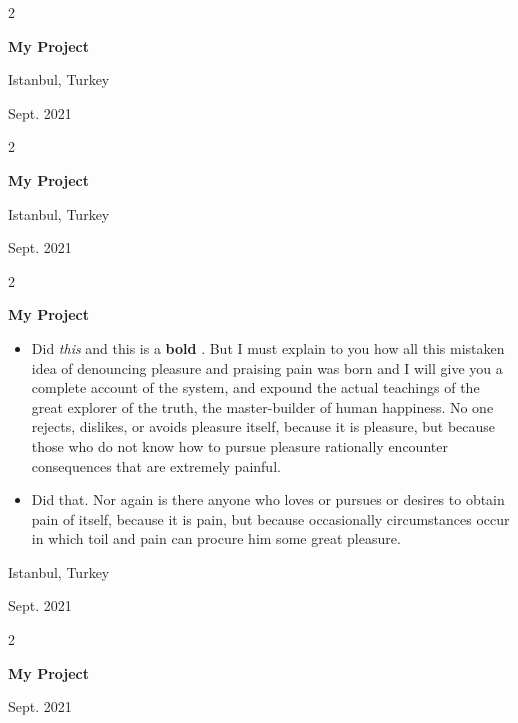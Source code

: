 \documentclass[10pt, letterpaper]{article}
\newenvironment{highlights}{
    \begin{itemize}[
        topsep=0.10 cm,
        parsep=0.10 cm,
        partopsep=0pt,
        itemsep=0pt,
        leftmargin=0.4 cm + 10pt
    ]
}{
    \end{itemize}
} %
\newenvironment{twocolentry}[2][]{
    \onecolentry
    \def\secondColumn{#2}
    \setcolumnwidth{\fill, 4.5 cm}
    \begin{paracol}{2}
}{
    \switchcolumn \raggedleft \secondColumn
    \end{paracol}
    \endonecolentry
} %
\let\hrefWithoutArrow\href
\renewcommand{\href}[2]{\hrefWithoutArrow{#1}{\mbox{\ifthenelse{\equal{#2}{}}{ }{#2 }\raisebox{.15ex}{\footnotesize \faExternalLink*}}}}
\begin{document}
        \vspace{0.2 cm}

        \begin{twocolentry}{
            Istanbul, Turkey

        Sept. 2021
        }
            \textbf{My Project}
        \end{twocolentry}


        \vspace{0.2 cm}

        \begin{twocolentry}{
            Istanbul, Turkey

        Sept. 2021
        }
            \textbf{My Project}
        \end{twocolentry}


        \vspace{0.2 cm}

        \begin{twocolentry}{
            Istanbul, Turkey

        Sept. 2021
        }
            \textbf{My Project}
            \begin{highlights}
                \item Did \textit{this} and this is a \textbf{bold} \href{https://example.com}{link}. But I must explain to you how all this mistaken idea of denouncing pleasure and praising pain was born and I will give you a complete account of the system, and expound the actual teachings of the great explorer of the truth, the master-builder of human happiness. No one rejects, dislikes, or avoids pleasure itself, because it is pleasure, but because those who do not know how to pursue pleasure rationally encounter consequences that are extremely painful.
                \item Did that. Nor again is there anyone who loves or pursues or desires to obtain pain of itself, because it is pain, but because occasionally circumstances occur in which toil and pain can procure him some great pleasure.
            \end{highlights}
        \end{twocolentry}


        \vspace{0.2 cm}

        \begin{twocolentry}{
            Sept. 2021
        }
            \textbf{My Project}
        \end{twocolentry}
\end{document}
